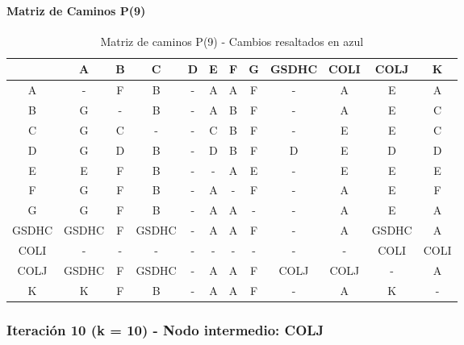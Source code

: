 \documentclass[12pt]{article}
\begin{document}
\paragraph{Matriz de Caminos P(9)}
\begin{table}[h!]
\centering
\begin{tabular}{|c|c|c|c|c|c|c|c|c|c|c|c|}
\hline
 & A & B & C & D & E & F & G & GSDHC & COLI & COLJ & K \\\hline
A & - & F & B & - & A & A & F & - & A & E & A \\\hline
B & G & - & B & - & A & B & F & - & A & E & C \\\hline
C & G & C & - & - & C & B & F & - & E & E & C \\\hline
D & G & D & B & - & D & B & F & D & E & D & D \\\hline
E & E & F & B & - & - & A & E & - & E & E & E \\\hline
F & G & F & B & - & A & - & F & - & A & E & F \\\hline
G & G & F & B & - & A & A & - & - & A & E & A \\\hline
GSDHC & GSDHC & F & GSDHC & - & A & A & F & - & A & GSDHC & A \\\hline
COLI & - & - & - & - & - & - & - & - & - & COLI & COLI \\\hline
COLJ & GSDHC & F & GSDHC & - & A & A & F & COLJ & COLJ & - & A \\\hline
K & K & F & B & - & A & A & F & - & A & K & - \\\hline
\end{tabular}
\caption{Matriz de caminos P(9) - Cambios resaltados en azul}
\end{table}

\subsubsection{Iteración 10 (k = 10) - Nodo intermedio: COLJ}
\end{document}
